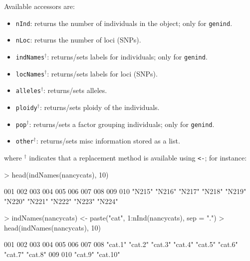 \documentclass{article}
\begin{document}
Available accessors are:
\begin{itemize}
  \item \texttt{nInd}: returns the number of individuals in the object; only for \texttt{genind}.
  \item \texttt{nLoc}: returns the number of loci (SNPs).
  \item \texttt{indNames}$^{\dagger}$: returns/sets labels for individuals; only for \texttt{genind}.
  \item \texttt{locNames}$^{\dagger}$: returns/sets labels for loci (SNPs).
  \item \texttt{alleles}$^{\dagger}$: returns/sets alleles.
  \item \texttt{ploidy}$^{\dagger}$: returns/sets ploidy of the individuals.
  \item \texttt{pop}$^{\dagger}$: returns/sets a factor grouping individuals; only for \texttt{genind}.
  \item \texttt{other}$^{\dagger}$: returns/sets misc information stored as a list.
\end{itemize}
where $^{\dagger}$ indicates that a replacement method is available using \texttt{<-}; for instance:
\begin{Schunk}
\begin{Sinput}
> head(indNames(nancycats), 10)
\end{Sinput}
\begin{Soutput}
   001    002    003    004    005    006    007    008    009    010 
"N215" "N216" "N217" "N218" "N219" "N220" "N221" "N222" "N223" "N224" 
\end{Soutput}
\begin{Sinput}
> indNames(nancycats) <- paste("cat", 1:nInd(nancycats), sep = ".")
> head(indNames(nancycats), 10)
\end{Sinput}
\begin{Soutput}
     001      002      003      004      005      006      007      008 
 "cat.1"  "cat.2"  "cat.3"  "cat.4"  "cat.5"  "cat.6"  "cat.7"  "cat.8" 
     009      010 
 "cat.9" "cat.10" 
\end{Soutput}
\end{Schunk}
\end{document}
